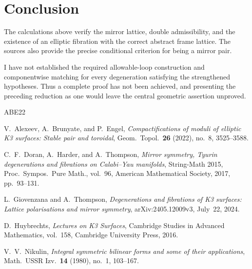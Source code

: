 \documentclass[11pt]{article}
\theoremstyle{remark}
\begin{document}
\section*{Conclusion}

The calculations above verify the mirror lattice, double
admissibility, and the existence of an elliptic fibration with the
correct abstract frame lattice.  The sources also provide the precise
conditional criterion for being a mirror pair.

I have not established the required allowable-loop construction and
componentwise matching for every degeneration satisfying the
strengthened hypotheses.  Thus a complete proof has not been
achieved, and presenting the preceding reduction as one would leave
the central geometric assertion unproved.

\begin{thebibliography}{ABE22}

V.~Alexeev, A.~Brunyate, and P.~Engel,
\emph{Compactifications of moduli of elliptic K3 surfaces:
Stable pair and toroidal},
Geom.\ Topol.\ \textbf{26} (2022), no.~8, 3525--3588.

C.~F.~Doran, A.~Harder, and A.~Thompson,
\emph{Mirror symmetry, Tyurin degenerations and fibrations on
Calabi--Yau manifolds},
String-Math 2015, Proc.\ Sympos.\ Pure Math., vol.~96,
American Mathematical Society, 2017, pp.~93--131.

L.~Giovenzana and A.~Thompson,
\emph{Degenerations and fibrations of K3 surfaces:
Lattice polarisations and mirror symmetry},
arXiv:2405.12009v3, July~22, 2024.

D.~Huybrechts,
\emph{Lectures on K3 Surfaces},
Cambridge Studies in Advanced Mathematics, vol.~158,
Cambridge University Press, 2016.

V.~V.~Nikulin,
\emph{Integral symmetric bilinear forms and some of their applications},
Math.\ USSR Izv.\ \textbf{14} (1980), no.~1, 103--167.

\end{thebibliography}
\end{document}
